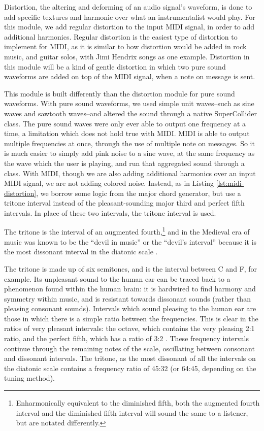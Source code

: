 Distortion, the altering and deforming of an audio signal's waveform, is done to add specific textures and harmonic over what an instrumentalist would play. For this module, we add regular distortion to the input MIDI signal, in order to add additional harmonics. Regular distortion is the easiest type of distortion to implement for MIDI, as it is similar to how distortion would be added in rock music, and guitar solos, with Jimi Hendrix songs as one example. Distortion in this module will be a kind of gentle distortion in which two pure sound waveforms are added on top of the MIDI signal, when a note on message is sent. 

This module is built differently than the distortion module for pure sound waveforms. With pure sound waveforms, we used simple unit waves--such as sine waves and sawtooth waves--and altered the sound through a native SuperCollider class. The pure sound waves were only ever able to output one frequency at a time, a limitation which does not hold true with MIDI. MIDI is able to output multiple frequencies at once, through the use of multiple note on messages. So it is much easier to simply add pink noise to a sine wave, at the same frequency as the wave which the user is playing, and run that aggregated sound through a class. With MIDI, though we are also adding additional harmonics over an input MIDI signal, we are not adding colored noise. Instead, as in Listing \ref{lst:midi-distortion}, we borrow some logic from the major chord generator, but use a tritone interval instead of the pleasant-sounding major third and perfect fifth intervals. In place of these two intervals, the tritone interval is used. 

The tritone is the interval of an augmented fourth,\footnote{Enharmonically equivalent to the diminished fifth, both the augmented fourth interval and the diminished fifth interval will sound the same to a listener, but are notated differently.} and in the Medieval era of music was known to be the ``devil in music'' or the ``devil's interval'' because it is the most dissonant interval in the diatonic scale \cite{Burkholder_Grout_Palisca_2014}. %

The tritone is made up of six semitones, and is the interval between C and F\musSharp{}, for example. Its unpleasant sound to the human ear can be traced back to a phenomenon found within the human brain: it is hardwired to find harmony and symmetry within music, and is resistant towards dissonant sounds (rather than pleasing consonant sounds). Intervals which sound pleasing to the human ear are those in which there is a simple ratio between the frequencies. This is clear in the ratios of very pleasant intervals: the octave, which contains the very pleasing 2:1 ratio, and the perfect fifth, which has a ratio of 3:2 \cite{Gann}. These frequency intervals continue through the remaining notes of the scale, oscillating between consonant and dissonant intervals. The tritone, as the most dissonant of all the intervals on the diatonic scale contains a frequency ratio of 45:32 (or 64:45, depending on the tuning method). 

